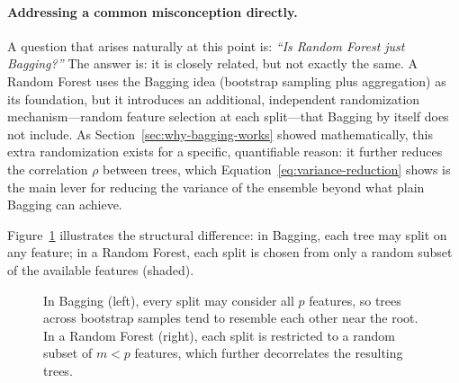 \documentclass[12pt,a4paper]{article}
\begin{document}
\paragraph{Addressing a common misconception directly.} A question that arises naturally at this point is: \emph{``Is Random Forest just Bagging?''} The answer is: it is closely related, but not exactly the same. A Random Forest uses the Bagging idea (bootstrap sampling plus aggregation) as its foundation, but it introduces an additional, independent randomization mechanism---random feature selection at each split---that Bagging by itself does not include. As Section~\ref{sec:why-bagging-works} showed mathematically, this extra randomization exists for a specific, quantifiable reason: it further reduces the correlation $\rho$ between trees, which Equation~\eqref{eq:variance-reduction} shows is the main lever for reducing the variance of the ensemble beyond what plain Bagging can achieve.

Figure~\ref{fig:bagging-vs-rf-diagram} illustrates the structural difference: in Bagging, each tree may split on any feature; in a Random Forest, each split is chosen from only a random subset of the available features (shaded).

\begin{figure}[h]
\centering
{}
\caption{In Bagging (left), every split may consider all $p$ features, so trees across bootstrap samples tend to resemble each other near the root. In a Random Forest (right), each split is restricted to a random subset of $m < p$ features, which further decorrelates the resulting trees.}
\label{fig:bagging-vs-rf-diagram}
\end{figure}
\end{document}
